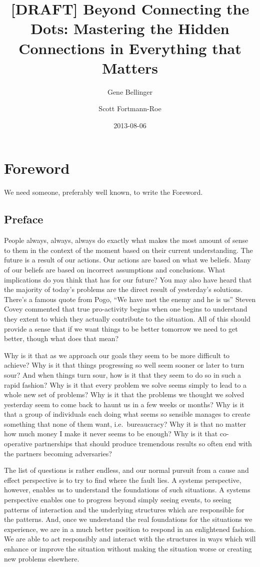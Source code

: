 \documentclass[]{memoir}
\title{{[}DRAFT{]} Beyond Connecting the Dots: Mastering the Hidden Connections
       in Everything that Matters}
\author{Gene Bellinger \and Scott Fortmann-Roe}
\date{2013-08-06}
\begin{document}
\maketitle

{
\hypersetup{linkcolor=black}
\setcounter{tocdepth}{1}
\tableofcontents
}
\chapter{Foreword}

We need someone, preferably well known, to write the Foreword.

\section{Preface}

People always, always, always do exactly what makes the most amount of
sense to them in the context of the moment based on their current
understanding. The future is a result of our actions. Our actions are
based on what we beliefs. Many of our beliefs are based on incorrect
assumptions and conclusions. What implications do you think that has for
our future? You may also have heard that the majority of today's
problems are the direct result of yesterday's solutions. There's a
famous quote from Pogo, ``We have met the enemy and he is us'' Steven
Covey commented that true pro-activity begins when one begins to
understand they extent to which they actually contribute to the
situation. All of this should provide a sense that if we want things to
be better tomorrow we need to get better, though what does that mean?

Why is it that as we approach our goals they seem to be more difficult
to achieve? Why is it that things progressing so well seem sooner or
later to turn sour? And when things turn sour, how is it that they seem
to do so in such a rapid fashion? Why is it that every problem we solve
seems simply to lead to a whole new set of problems? Why is it that the
problems we thought we solved yesterday seem to come back to haunt us in
a few weeks or months? Why is it that a group of individuals each doing
what seems so sensible manages to create something that none of them
want, i.e.~bureaucracy? Why it is that no matter how much money I make
it never seems to be enough? Why is it that co-operative partnerships
that should produce tremendous results so often end with the partners
becoming adversaries?

The list of questions is rather endless, and our normal pursuit from a
cause and effect perspective is to try to find where the fault lies. A
systems perspective, however, enables us to understand the foundations
of such situations. A systems perspective enables one to progress beyond
simply seeing events, to seeing patterns of interaction and the
underlying structures which are responsible for the patterns. And, once
we understand the real foundations for the situations we experience, we
are in a much better position to respond in an enlightened fashion. We
are able to act responsibly and interact with the structures in ways
which will enhance or improve the situation without making the situation
worse or creating new problems elsewhere.
\end{document}
